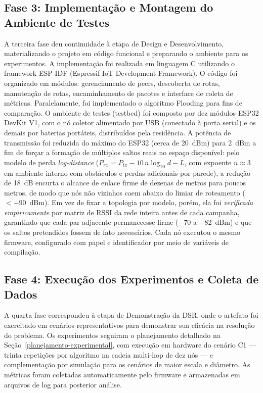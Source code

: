 \subsection{Fase 3: Implementação e Montagem do Ambiente de
Testes}\label{fase-3-implementauxe7uxe3o-e-montagem-do-ambiente-de-testes}

A terceira fase deu continuidade à etapa de Design e Desenvolvimento,
materializando o projeto em código funcional e preparando o ambiente
para os experimentos. A implementação foi realizada em linguagem C
utilizando o framework ESP-IDF (Espressif IoT Development Framework). O
código foi organizado em módulos: gerenciamento de peers, descoberta de
rotas, manutenção de rotas, encaminhamento de pacotes e interface de
coleta de métricas. Paralelamente, foi implementado o algoritmo
Flooding para fins de comparação. O ambiente de testes (testbed) foi
composto por dez módulos ESP32 DevKit V1, com o nó coletor alimentado por
USB (conectado à porta serial) e os demais por baterias portáteis,
distribuídos pela residência. A potência de transmissão foi reduzida do
máximo do ESP32 (cerca de 20~dBm) para 2~dBm a fim de forçar a formação de
múltiplos saltos reais no espaço disponível: pelo modelo de perda
\emph{log-distance} ($P_{rx} = P_{tx} - 10\,n\log_{10}d - L$, com expoente
$n \approx 3$ em ambiente interno com obstáculos e perdas adicionais por
parede), a redução de 18~dB encurta o alcance de enlace firme de dezenas de
metros para poucos metros, de modo que nós não vizinhos caem abaixo do
limiar de roteamento ($<-90$~dBm). Em vez de fixar a topologia por modelo,
porém, ela foi \emph{verificada empiricamente} por matriz de RSSI da rede
inteira antes de cada campanha, garantindo que cada par adjacente
permanecesse firme ($-70$ a $-82$~dBm) e que os saltos pretendidos fossem
de fato necessários. Cada nó executou o mesmo firmware, configurado com
papel e identificador por meio de variáveis de compilação.

\subsection{Fase 4: Execução dos Experimentos e Coleta de
Dados}\label{fase-4-execuuxe7uxe3o-dos-experimentos-e-coleta-de-dados}

A quarta fase correspondeu à etapa de Demonstração da DSR, onde o
artefato foi exercitado em cenários representativos para demonstrar sua
eficácia na resolução do problema. Os experimentos seguiram o
planejamento detalhado na Seção~\ref{planejamento-experimental}, com execução em hardware
do cenário C1 --- trinta repetições por algoritmo na cadeia multi-hop de
dez nós --- e complementação por simulação para os cenários de maior
escala e diâmetro. As métricas foram coletadas automaticamente pelo firmware e
armazenadas em arquivos de log para posterior análise.

